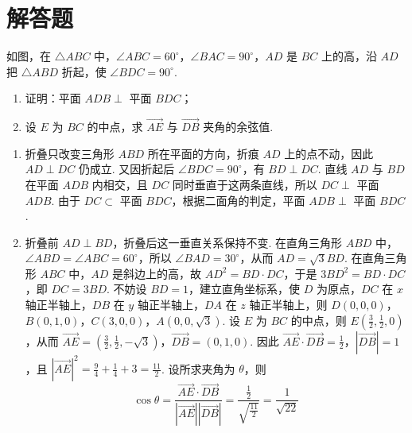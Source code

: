 \section{解答题}

\begin{problem}
如图，在 \(\triangle ABC\) 中，\(\angle ABC = 60^{\circ}\)，\(\angle BAC = 90^{\circ}\)，\(AD\) 是 \(BC\) 上的高，沿 \(AD\) 把 \(\triangle ABD\) 折起，使 \(\angle BDC = 90^{\circ}\).
\begin{enumerate}
\item 证明：平面 \(ADB\perp\) 平面 \(BDC\)；
\item 设 \(E\) 为 \(BC\) 的中点，求 \(\overrightarrow{AE}\) 与 \(\overrightarrow{DB}\) 夹角的余弦值.
\end{enumerate}

\end{problem}

\begin{solution}
\begin{enumerate}
\item 折叠只改变三角形 \(ABD\) 所在平面的方向，折痕 \(AD\) 上的点不动，因此 \(AD\perp DC\) 仍成立. 又因折起后 \(\angle BDC=90^{\circ}\)，有 \(BD\perp DC\). 直线 \(AD\) 与 \(BD\) 在平面 \(ADB\) 内相交，且 \(DC\) 同时垂直于这两条直线，所以 \(DC\perp\) 平面 \(ADB\). 由于 \(DC\subset\) 平面 \(BDC\)，根据二面角的判定，平面 \(ADB\perp\) 平面 \(BDC\).
\item 折叠前 \(AD\perp BD\)，折叠后这一垂直关系保持不变. 在直角三角形 \(ABD\) 中，\(\angle ABD=\angle ABC=60^{\circ}\)，所以 \(\angle BAD=30^{\circ}\)，从而 \(AD=\sqrt{3}BD\). 在直角三角形 \(ABC\) 中，\(AD\) 是斜边上的高，故
\(AD^{2}=BD\cdot DC\)，于是 \(3BD^{2}=BD\cdot DC\)，即 \(DC=3BD\). 不妨设 \(BD=1\)，建立直角坐标系，使 \(D\) 为原点，\(DC\) 在 \(x\) 轴正半轴上，\(DB\) 在 \(y\) 轴正半轴上，\(DA\) 在 \(z\) 轴正半轴上，则
\(D(0,0,0)\)，\(B(0,1,0)\)，\(C(3,0,0)\)，\(A(0,0,\sqrt{3})\).
设 \(E\) 为 \(BC\) 的中点，则 \(E\left(\frac{3}{2},\frac{1}{2},0\right)\)，从而
\(\overrightarrow{AE}=\left(\frac{3}{2},\frac{1}{2},-\sqrt{3}\right)\)，\(\overrightarrow{DB}=(0,1,0)\).
因此 \(\overrightarrow{AE}\cdot\overrightarrow{DB}=\frac{1}{2}\)，\(\left|\overrightarrow{DB}\right|=1\)，且 \(\left|\overrightarrow{AE}\right|^{2}=\frac{9}{4}+\frac{1}{4}+3=\frac{11}{2}\). 设所求夹角为 \(\theta\)，则
\[
\cos\theta=\frac{\overrightarrow{AE}\cdot\overrightarrow{DB}}{\left|\overrightarrow{AE}\right|\left|\overrightarrow{DB}\right|}=\frac{\frac{1}{2}}{\sqrt{\frac{11}{2}}}=\frac{1}{\sqrt{22}}
\]
\end{enumerate}
\end{solution}

